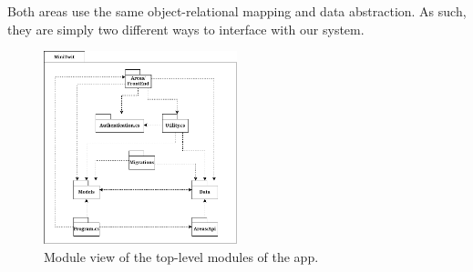 Both areas use the same object-relational mapping and data abstraction. As such, they are simply two different ways to interface with our system.

\begin{figure}
  \begin{center}
    \includegraphics[width=0.50\textwidth]{img/module1.pdf}
  \end{center}
  \caption{Module view of the top-level modules of the app.}\label{fig:module1}
\end{figure}



